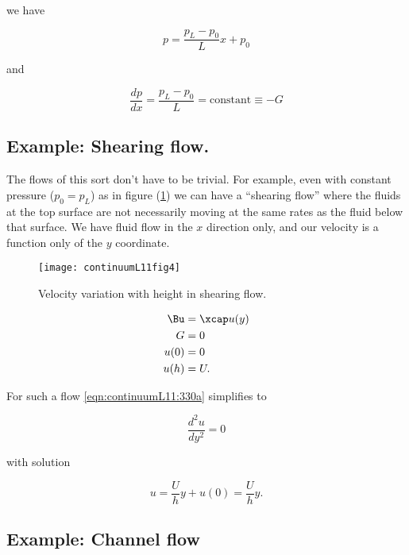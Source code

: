 we have

\begin{equation}\label{eqn:continuumL11:450}
p = \frac{p_L - p_0}{L} x + p_0
\end{equation}

and

\begin{equation}\label{eqn:continuumL11:470}
\frac{dp}{dx} = \frac{p_L - p_0}{L} = \text{constant} \equiv -G
\end{equation}

\subsection{Example: Shearing flow.}

The flows of this sort don't have to be trivial.  For example, even with constant pressure ($p_0 = p_L$) as in figure (\ref{fig:continuumL11:continuumL11fig4}) we can have a ``shearing flow'' where the fluids at the top surface are not necessarily moving at the same rates as the fluid below that surface.  We have fluid flow in the $x$ direction only, and our velocity is a function only of the $y$ coordinate.

\begin{figure}[htp]
   \centering
   \texttt{[image: continuumL11fig4]}
   \caption{Velocity variation with height in shearing flow.}\label{fig:continuumL11:continuumL11fig4}
\end{figure}

\begin{align}\label{eqn:continuumL11:490}
\Bu &= \xcap u(y) \\
G &= 0 \\
u(0) &= 0 \\
u(h) &= U.
\end{align}

For such a flow \ref{eqn:continuumL11:330a} simplifies to

\begin{equation}\label{eqn:continuumL11:530}
\frac{d^2 u}{dy^2} = 0
\end{equation}

with solution

\begin{equation}\label{eqn:continuumL11:550}
u = \frac{U}{h} y + u(0) = \frac{U}{h} y.
\end{equation}

\subsection{Example: Channel flow}


